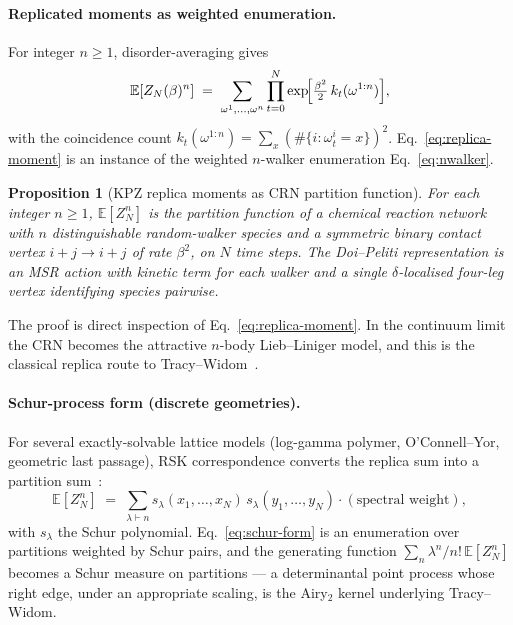 \documentclass[10pt,a4paper,twocolumn]{article}
\theoremstyle{plain}
\newtheorem{proposition}[theorem]{Proposition}
\theoremstyle{definition}
\newcommand{\Ex}{\mathbb{E}}
\begin{document}
\paragraph{Replicated moments as weighted enumeration.}
For integer $n \geq 1$, disorder-averaging gives
\begin{equation}
  \Ex[Z_N(\beta)^n]
  \;=\; \sum_{\omega^1, \ldots, \omega^n}
        \prod_{t=0}^N
        \exp\!\Bigl[\tfrac{\beta^2}{2}\,
           k_t(\omega^{1:n})\Bigr],
  \label{eq:replica-moment}
\end{equation}
with the coincidence count
$k_t(\omega^{1:n}) = \sum_x (\#\{i : \omega^i_t = x\})^2$.
Eq.~\eqref{eq:replica-moment} is an instance of the weighted
$n$-walker enumeration Eq.~\eqref{eq:nwalker}.

\begin{proposition}[KPZ replica moments as CRN partition function]
\label{prop:kpz-replica}
For each integer $n \geq 1$, $\Ex[Z_N^n]$ is the partition function
of a chemical reaction network with $n$ distinguishable random-walker
species and a symmetric binary contact vertex
$i + j \to i + j$ of rate $\beta^2$, on $N$ time steps.  The
Doi--Peliti representation is an MSR action with kinetic term for
each walker and a single $\delta$-localised four-leg vertex
identifying species pairwise.
\end{proposition}

The proof is direct inspection of Eq.~\eqref{eq:replica-moment}.  In
the continuum limit the CRN becomes the attractive $n$-body
Lieb--Liniger model, and this is the classical replica route to
Tracy--Widom~\citep{Krajenbrink}.

\paragraph{Schur-process form (discrete geometries).}
For several exactly-solvable lattice models (log-gamma polymer,
O'Connell--Yor, geometric last passage), RSK correspondence converts
the replica sum into a partition sum~\citep{BorodinCorwin2014}:
\begin{equation}
  \Ex[Z_N^n] \;=\; \sum_{\lambda \vdash n} s_\lambda(x_1, \ldots, x_N)\,
      s_\lambda(y_1, \ldots, y_N) \cdot (\text{spectral weight}),
  \label{eq:schur-form}
\end{equation}
with $s_\lambda$ the Schur polynomial.  Eq.~\eqref{eq:schur-form} is
an enumeration over partitions weighted by Schur pairs, and the
generating function $\sum_n \lambda^n / n!\, \Ex[Z_N^n]$ becomes a
Schur measure on partitions --- a determinantal point process whose
right edge, under an appropriate scaling, is the Airy$_2$ kernel
underlying Tracy--Widom.
\end{document}

